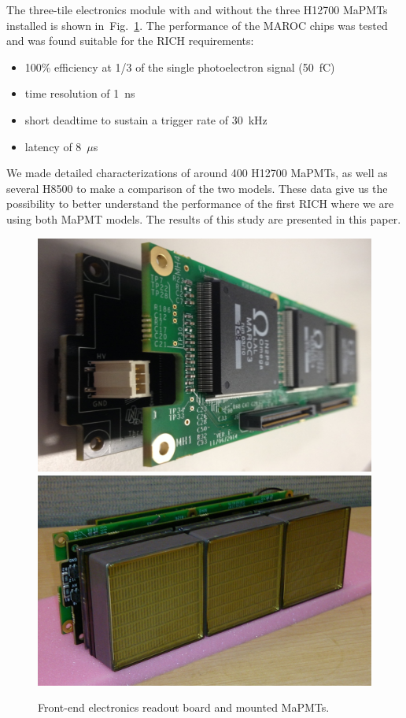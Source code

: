 The three-tile electronics module with and without the three H12700 MaPMTs installed is shown in~Fig.~\ref{fig:feboards}.
The performance of the MAROC chips was tested and was found suitable for the RICH requirements:
\begin{itemize}
	\item 100\% efficiency at 1/3 of the single photoelectron signal (50~fC)
	\item time resolution of 1~ns
	\item short deadtime to sustain a trigger rate of 30~kHz
	\item latency of 8~$\mu$s
\end{itemize}
We made detailed characterizations of around 400 H12700 MaPMTs, as well as several H8500  to make a comparison of the two models.
These data give us the possibility to better understand the performance of the first RICH where we are using both MaPMT models.
The results of this study are presented in this paper.

\begin{figure}[htb]
  \centering
  \includegraphics[width=0.8\linewidth]{figures/fe1.pdf}
  \includegraphics[width=0.8\linewidth]{figures/frontendPMT.pdf}
  \caption{Front-end electronics readout board and mounted MaPMTs.}
  \label{fig:feboards}
\end{figure}






